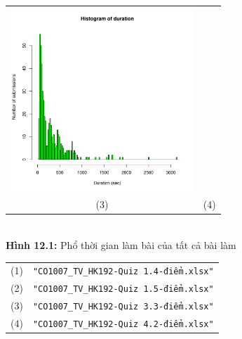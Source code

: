 \documentclass[a4paper]{article}
\theoremstyle{definition}
\begin{document}
\begin{enumerate}[a)]
\begin{itemize}
\begin{center}
\begin{tabular}{c c}
                 \includegraphics[width = 6.9cm]{Images/img12-1-4.png} \\
                 (3) & (4)
            \end{tabular}\\
            \textbf{Hình 12.1:} Phổ thời gian làm bài của tất cả bài làm\\
            \begin{tabular}{c c}
                 (1) & \texttt{"CO1007\_TV\_HK192-Quiz 1.4-điểm.xlsx"}\\
                 (2) & \texttt{"CO1007\_TV\_HK192-Quiz 1.5-điểm.xlsx"}\\
                 (3) & \texttt{"CO1007\_TV\_HK192-Quiz 3.3-điểm.xlsx"}\\
                 (4) & \texttt{"CO1007\_TV\_HK192-Quiz 4.2-điểm.xlsx"}
            \end{tabular}
        \end{center}
        \begin{center}
            \begin{tabular}{c c}

\end{tabular}
\end{center}
\end{itemize}
\end{enumerate}
\end{document}
